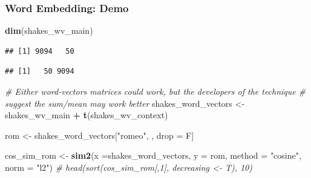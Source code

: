 \documentclass[
  shownotes,
  xcolor={svgnames},
  hyperref={colorlinks,citecolor=DarkBlue,linkcolor=DarkRed,urlcolor=DarkBlue}
  , aspectratio=169]{beamer}
\newenvironment{Shaded}{\begin{snugshade}}{\end{snugshade}}
\newcommand{\CommentTok}[1]{\textcolor[rgb]{0.56,0.35,0.01}{\textit{#1}}}
\newcommand{\DataTypeTok}[1]{\textcolor[rgb]{0.13,0.29,0.53}{#1}}
\newcommand{\KeywordTok}[1]{\textcolor[rgb]{0.13,0.29,0.53}{\textbf{#1}}}
\newcommand{\NormalTok}[1]{#1}
\newcommand{\OperatorTok}[1]{\textcolor[rgb]{0.81,0.36,0.00}{\textbf{#1}}}
\newcommand{\StringTok}[1]{\textcolor[rgb]{0.31,0.60,0.02}{#1}}
\begin{document}
\begin{frame}[fragile]
\frametitle{Word Embedding: Demo }

\begin{scriptsize}

\begin{Shaded}
\begin{Highlighting}[]
\KeywordTok{dim}\NormalTok{(shakes\_wv\_main)}
\end{Highlighting}
\end{Shaded}
\end{scriptsize}
\begin{tiny}
\begin{verbatim}
## [1] 9094   50
\end{verbatim}
\end{tiny}

\begin{scriptsize}


\begin{Shaded}
\end{Shaded}
\end{scriptsize}
\begin{tiny}

\begin{verbatim}
## [1]   50 9094
\end{verbatim}
\end{tiny}

\begin{scriptsize}


\begin{Shaded}
\begin{Highlighting}[]
\CommentTok{\# Either word{-}vectors matrices could work, but the developers of the technique}
\CommentTok{\# suggest the sum/mean may work better}
\NormalTok{shakes\_word\_vectors \textless{}{-}}\StringTok{ }\NormalTok{shakes\_wv\_main }\OperatorTok{+}\StringTok{ }\KeywordTok{t}\NormalTok{(shakes\_wv\_context)}

\NormalTok{rom \textless{}{-}}\StringTok{ }\NormalTok{shakes\_word\_vectors[}\StringTok{"romeo"}\NormalTok{, , drop =}\StringTok{ }\NormalTok{F]}

\NormalTok{cos\_sim\_rom \textless{}{-}}\StringTok{ }\KeywordTok{sim2}\NormalTok{(}\DataTypeTok{x =}\NormalTok{shakes\_word\_vectors, }\DataTypeTok{y =}\NormalTok{ rom, }\DataTypeTok{method =} \StringTok{"cosine"}\NormalTok{, }\DataTypeTok{norm =} \StringTok{"l2"}\NormalTok{)}
\CommentTok{\# head(sort(cos\_sim\_rom[,1], decreasing \textless{}{-} T), 10)}
\end{Highlighting}
\end{Shaded}


\end{scriptsize}
\end{frame}
\end{document}
